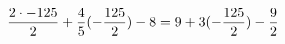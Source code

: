 \documentclass[preview]{standalone}
\begin{document}
\begin{align*}
\special{dvisvgm:raw <g id='unique000'>}\frac{2 \cdot -125}{2} + \frac{4}{5} (- \frac{125}{2}) - 8 = 9 + 3(- \frac{125}{2}) - \frac{9}{2}\special{dvisvgm:raw </g>}
\end{align*}
\end{document}
